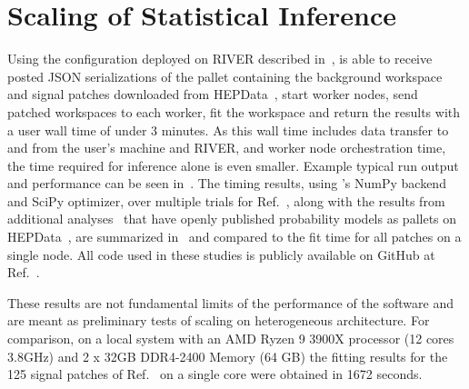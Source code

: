 \section{Scaling of Statistical Inference}\label{sec:results}
%
Using the \funcX{} configuration deployed on RIVER described in~, \funcX{} is able to receive posted JSON serializations of the \pyhf{} pallet containing the background workspace and signal patches downloaded from HEPData~\cite{ATLAS_SUSY_1Lbb_pallet}, start \funcX{} worker nodes, send patched workspaces to each worker, fit the workspace and return the results with a user wall time of under 3 minutes.
As this wall time includes data transfer to and from the user's machine and RIVER, and worker node orchestration time, the time required for inference alone is even smaller.
Example typical run output and performance can be seen in~.
The timing results, using \pyhf{}'s NumPy backend and SciPy optimizer, over multiple trials for Ref.~\cite{ATLAS_SUSY_1Lbb_pallet}, along with the results from additional analyses~\cite{SUSY-2018-09,SUSY-2018-04} that have openly published probability models as \pyhf{} pallets on HEPData~\cite{ATLAS_SUSY_SS3L_pallet,ATLAS_SUSY_staus_pallet}, are summarized in~ and compared to the fit time for all patches on a single node.
All code used in these studies is publicly available on GitHub at Ref.~\cite{study_code}.



These results are not fundamental limits of the performance of the software and are meant as preliminary tests of scaling on heterogeneous architecture.
For comparison, on a local system with an AMD Ryzen 9 3900X processor (12 cores 3.8GHz) and 2 x 32GB DDR4-2400 Memory (64 GB) the fitting results for the 125 signal patches of Ref.~\cite{ATLAS_SUSY_1Lbb_pallet} on a single core were obtained in 1672 seconds.
